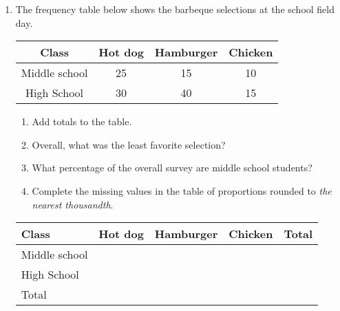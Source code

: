 \documentclass[12pt, twoside]{article}
\begin{document}
\begin{enumerate}[itemsep=0.5cm]
\newpage
\item The frequency table below shows the barbeque selections at the school field day.
    \begin{center}
        \begin{tabular}{|c|c|c|c|}
            \hline
            Class & Hot dog & Hamburger & Chicken \\
            \hline
            Middle school & 25 & 15 & 10 \\[0.25cm]
            \hline
            High School & 30 & 40 & 15 \\[0.25cm]
            \hline
        \end{tabular}
    \end{center} \vspace{1cm}
    \begin{enumerate}
        \item Add totals to the table.
        \item Overall, what was the least favorite selection? \vspace{1cm}
        \item What percentage of the overall survey are middle school students? \vspace{2cm}
        \item Complete the missing values in the table of proportions rounded to \emph{the nearest thousandth}.
    \end{enumerate}
    \begin{center}
        \begin{tabular}{|p{3cm}|p{2cm}|p{2cm}|p{2cm}|p{2cm}|}
            \hline
            Class & Hot dog & Hamburger & Chicken & \quad Total\\
            \hline
            Middle school  & & & & \\[0.25cm]
            \hline
            High School &  & & & \\[0.25cm]
            \hline
            Total & & & & \\[0.25cm]
            \hline
        \end{tabular}
    \end{center} 


\end{enumerate}
\end{document}
